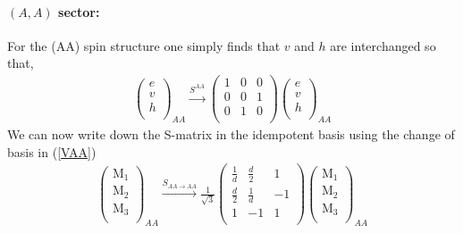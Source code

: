 \documentclass[12pt,a4paper]{article}
\newcounter{arrow}
\begin{document}
\paragraph{$(A,A)$ sector:}
For the (AA) spin structure one simply finds that $v$ and $h$ are interchanged so that,
\begin{align}
\left( \begin{matrix}
e\\
v\\
h\\
\end{matrix} \right)_{AA}
\xrightarrow{S^{AA}}
\left(\begin{matrix}
1& 0& 0 \\
0& 0&1  \\
0&1 &0 \\ 
\end{matrix} \right)
\left( \begin{matrix}
e\\
v\\
h\\
\end{matrix} \right)_{AA}
\end{align}
We can now write down the S-matrix in the idempotent basis using the change of basis in (\ref{VAA})
\begin{align}
\left( \begin{matrix}
\text{M}_1\\
\text{M}_2\\
\text{M}_3\\
\end{matrix} \right)_{AA} \xrightarrow{S_{AA \rightarrow AA}} 
\frac{1}{\sqrt{3}}\left( \begin{matrix}
\frac{1}{d} & \frac{d}{2} & 1\\ 
\frac{d}{2} & \frac{1}{d} & -1\\
1 & -1 & 1\\
\end{matrix} \right)
\left( \begin{matrix}
\text{M}_1\\
\text{M}_2\\
\text{M}_3\\
\end{matrix} \right)_{AA}
\end{align}
\end{document}
